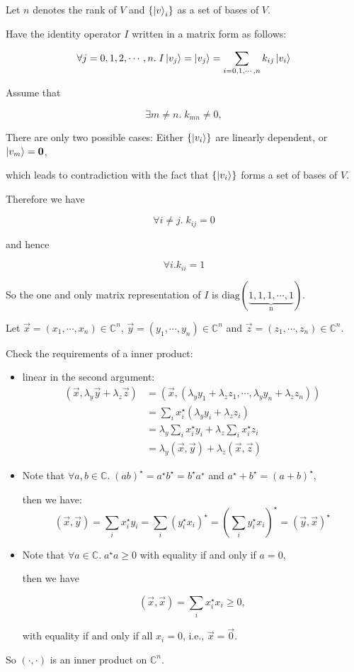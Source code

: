 \documentclass{homeworg}
\begin{document}
\exercise*
Let $n$ denotes the rank of $V$ and $\{\ket{v}_i\}$ as a set of bases of $V$.

Have the identity operator $I$ written in a matrix form as follows:

\[\forall{j=0,1,2,\cdots, n}.\;I\ket{v_j}=\ket{v_j}=\sum_{i=0,1,\cdots,n}k_{ij}\ket{v_i}\]

Assume that 

\[\exists{m\neq n}.\;k_{mn}\neq0,\]

There are only two possible cases: Either $\{\ket{v_i}\}$ are linearly dependent, or $\ket{v_m}=\bm{0}$,

which leads to contradiction with the fact that $\{\ket{v_i}\}$ forms a set of bases of $V$.

Therefore we have

\[\forall{i\neq j}.\;k_{ij}=0\]

and hence 

\[\forall i. k_{ii} = 1\]

So the one and only matrix representation of $I$ is $\mathrm{diag(\underbrace{1,1,1,\cdots,1}_{n})}$.

\exercise*
Let $\vec{x}=(x_1,\cdots,x_n)\in \mathbb{C}^n$, $\vec{y}=(y_1,\cdots,y_n)\in \mathbb{C}^n$ and  $\vec{z} =(z_1,\cdots,z_n)\in \mathbb{C}^n$.

Check the requirements of a inner product:
\begin{itemize}
    \item linear in the second argument:
    \begin{align}
    (\vec{x},\lambda_y \vec{y} +\lambda_z \vec{z})&=(\vec{x},(\lambda_y y_1 +\lambda_z z_1,\cdots,\lambda_y y_n +\lambda_z z_n))\nonumber\\
    &=\sum_i x_i^\star (\lambda_y y_i +\lambda_z z_i)\nonumber\\
    &=\lambda_y\sum_i x_i^\star y_i + \lambda_z\sum_i x_i^\star z_i\nonumber\\
    &=\lambda_y(\vec{x},\vec{y})+\lambda_z(\vec{x},\vec{z})\nonumber
    \end{align}
    \item Note that $\forall{a,b}\in \mathbb{C}.\;(ab)^\star=a^\star b^\star = b^\star a^\star$ and $a^\star + b^\star = (a+b)^\star$,
    
    then we have:
    \[(\vec{x},\vec{y})=\sum_i x_i^\star y_i=\sum_i (y_i^\star x_i)^\star=(\sum_i y_i^\star x_i)^\star=(\vec{y},\vec{x})^\star\]
    \item  Note that $\forall{a}\in \mathbb{C}.\;a^\star a\geq 0$ with equality if and only if $a=0$,
    
    then we have
    
    \[(\vec{x},\vec{x})=\sum_i x_i^\star x_i\geq 0,\]
    
    with equality if and only if all $x_i=0$, i.e., $\vec{x}=\vec{0}$.
    
\end{itemize}
So $(\cdot,\cdot)$ is an inner product on $\mathbb{C}^n$.
\end{document}
